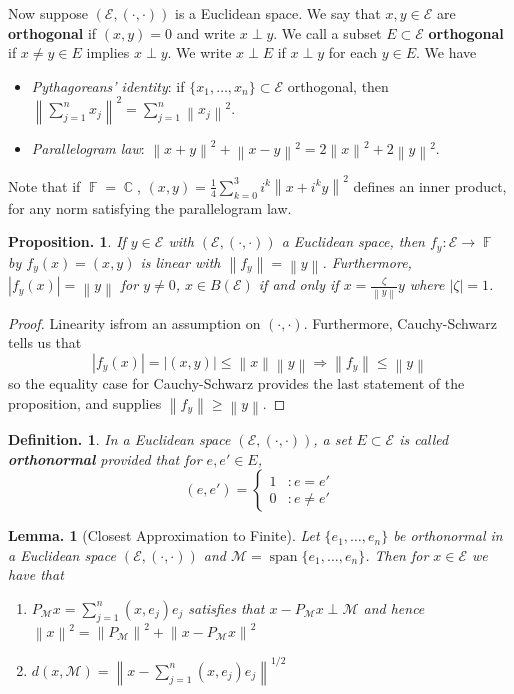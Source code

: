 \documentclass[11pt, a4paper]{memoir}
\DeclareMathOperator{\C}{{\mathbb{C}}}
\DeclareMathOperator{\F}{{\mathbb{F}}}
\newcommand{\norm}[1]{\ensuremath{\left\lVert#1\right\rVert}}
\theoremstyle{change}
\newtheorem{lemma}[theorem]{Lemma.}
\newtheorem{proposition}[theorem]{Proposition.}
\theoremstyle{plain}
\theoremstyle{nonumberplain}
\newtheorem{definition}{Definition.}
\newtheorem{proof}{Proof}
\DeclareMathOperator{\spn}{span}
\newcommand{\inr}[1]{\ensuremath{\left(#1\right)}}
\numberwithin{equation}{section}
\begin{document}
Now suppose $(\mathcal{E},\inr{\cdot,\cdot})$ is a Euclidean space.
We say that $x,y\in\mathcal{E}$ are \textbf{orthogonal} if $\inr{x,y}=0$ and write $x\perp y$.
We call a subset $E\subset\mathcal{E}$ \textbf{orthogonal} if $x\neq y\in E$ implies $x\perp y$.
We write $x\perp E$ if $x\perp y$ for each $y\in E$.
We have
\begin{itemize}[nl]
    \item \textit{Pythagoreans' identity}: if $\{x_1,\ldots,x_n\}\subset\mathcal{E}$ orthogonal, then $\norm{\sum_{j=1}^n x_j}^2=\sum_{j=1}^n\norm{x_j}^2$.
    \item \textit{Parallelogram law}: $\norm{x+y}^2+\norm{x-y}^2=2\norm{x}^2+2\norm{y}^2$.
\end{itemize}
Note that if $\F=\C$, $\inr{x,y}=\frac{1}{4}\sum_{k=0}^3 i^k\norm{x+i^ky}^2$ defines an inner product, for any norm satisfying the parallelogram law.
\begin{proposition}
    If $y\in\mathcal{E}$ with $(\mathcal{E},\inr{\cdot,\cdot})$ a Euclidean space, then $f_y:\mathcal{E}\to\F$ by $f_y(x)=\inr{x,y}$ is linear with $\norm{f_y}=\norm{y}$.
    Furthermore, $|f_y(x)|=\norm{y}$ for $y\neq 0$, $x\in B(\mathcal{E})$ if and only if $x=\frac{\zeta}{\norm{y}}y$ where $|\zeta|=1$.
\end{proposition}
\begin{proof}
    Linearity isfrom an assumption on $\inr{\cdot,\cdot}$.
    Furthermore, Cauchy-Schwarz tells us that
    \begin{equation*}
        |f_y(x)|=|\inr{x,y}|\leq\norm{x}\norm{y}\Rightarrow\norm{f_y}\leq\norm{y}
    \end{equation*}
    so the equality case for Cauchy-Schwarz provides the last statement of the proposition, and supplies $\norm{f_y}\geq\norm{y}$.
\end{proof}
\begin{definition}
    In a Euclidean space $(\mathcal{E},\inr{\cdot,\cdot})$, a set $E\subset\mathcal{E}$ is called \textbf{orthonormal} provided that for $e,e'\in E$,
    \begin{equation*}
        \inr{e,e'}=\begin{cases}
            1 &: e=e'\\
            0 &: e\neq e'
        \end{cases}
    \end{equation*}
\end{definition}
\begin{lemma}[Closest Approximation to Finite]
    Let $\{e_1,\ldots,e_n\}$ be orthonormal in a Euclidean space $(\mathcal{E},\inr{\cdot,\cdot})$ and $\mathcal{M}=\spn\{e_1,\ldots,e_n\}$.
    Then for $x\in\mathcal{E}$ we have that
    \begin{enumerate}[nl,r]
        \item $P_{\mathcal{M}}x=\sum_{j=1}^n \inr{x,e_j}e_j$ satisfies that $x-P_{\mathcal{M}}x\perp\mathcal{M}$ and hence $\norm{x}^2=\norm{P_{\mathcal{M}}}^2+\norm{x-P_{\mathcal{M}}x}^2$
        \item $d(x,\mathcal{M})=\norm{x-\sum_{j=1}^n(x,e_j)e_j}^{1/2}$
    \end{enumerate}
\end{lemma}
\end{document}
